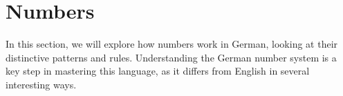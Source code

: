 \section{Numbers}\label{sec:numbers}

In this section, we will explore how numbers work in German, looking at their distinctive patterns and rules. Understanding the German number system is a key step in mastering this language, as it differs from English in several interesting ways.

